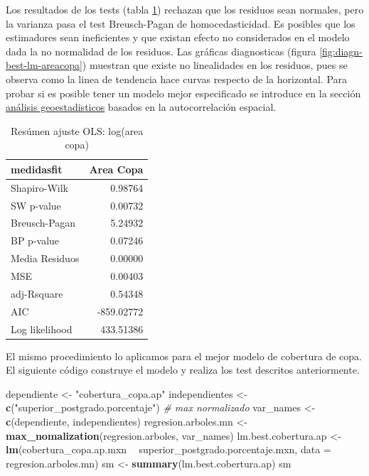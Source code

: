 \documentclass[12pt,]{book}
\newenvironment{Shaded}{\begin{snugshade}}{\end{snugshade}}
\newcommand{\KeywordTok}[1]{\textcolor[rgb]{0.13,0.29,0.53}{\textbf{#1}}}
\newcommand{\DataTypeTok}[1]{\textcolor[rgb]{0.13,0.29,0.53}{#1}}
\newcommand{\StringTok}[1]{\textcolor[rgb]{0.31,0.60,0.02}{#1}}
\newcommand{\CommentTok}[1]{\textcolor[rgb]{0.56,0.35,0.01}{\textit{#1}}}
\newcommand{\OperatorTok}[1]{\textcolor[rgb]{0.81,0.36,0.00}{\textbf{#1}}}
\newcommand{\NormalTok}[1]{#1}
\begin{document}
Los resultados de los tests (tabla \ref{tab:fitlm-copa-best}) rechazan
que los residuos sean normales, pero la varianza pasa el test
Breusch-Pagan de homocedasticidad. Es posibles que los estimadores sean
ineficientes y que existan efecto no considerados en el modelo dada la
no normalidad de los residuos. Las gráficas diagnosticas (figura
\ref{fig:diagn-best-lm-areacopa}) muestran que existe no linealidades en
los residuos, pues se observa como la linea de tendencia hace curvas
respecto de la horizontal. Para probar si es posible tener un modelo
mejor especificado se introduce en la sección
\protect\hyperlink{geostat}{análisis geoestadisticos} basados en la
autocorrelación espacial.

\begin{table}

\caption{\label{tab:fitlm-copa-best}Resúmen ajuste OLS: log(area copa)}
\centering
\begin{tabular}[t]{l|r}
\hline
medidasfit & Area Copa\\
\hline
Shapiro-Wilk & 0.98764\\
\hline
SW p-value & 0.00732\\
\hline
Breusch-Pagan & 5.24932\\
\hline
BP p-value & 0.07246\\
\hline
Media Residuos & 0.00000\\
\hline
MSE & 0.00403\\
\hline
adj-Rsquare & 0.54348\\
\hline
AIC & -859.02772\\
\hline
Log likelihood & 433.51386\\
\hline
\end{tabular}
\end{table}

El mismo procedimiento lo aplicamos para el mejor modelo de cobertura de
copa. El siguiente código construye el modelo y realiza los test
descritos anteriormente.

\begin{Shaded}
\begin{Highlighting}[]
\NormalTok{dependiente <-}\StringTok{ "cobertura_copa.ap"}
\NormalTok{independientes <-}\StringTok{ }\KeywordTok{c}\NormalTok{(}\StringTok{"superior_postgrado.porcentaje"}\NormalTok{)}
\CommentTok{# max normalizado}
\NormalTok{var_names <-}\StringTok{ }\KeywordTok{c}\NormalTok{(dependiente, independientes)}
\NormalTok{regresion.arboles.mn <-}\StringTok{ }\KeywordTok{max_nomalization}\NormalTok{(regresion.arboles, var_names)}
\NormalTok{lm.best.cobertura.ap <-}\StringTok{ }\KeywordTok{lm}\NormalTok{(cobertura_copa.ap.mxn }\OperatorTok{~}\StringTok{ }\NormalTok{superior_postgrado.porcentaje.mxn, }
    \DataTypeTok{data =}\NormalTok{ regresion.arboles.mn)}
\NormalTok{sm <-}\StringTok{ }\KeywordTok{summary}\NormalTok{(lm.best.cobertura.ap)}
\NormalTok{sm}
\end{Highlighting}
\end{Shaded}
\end{document}
